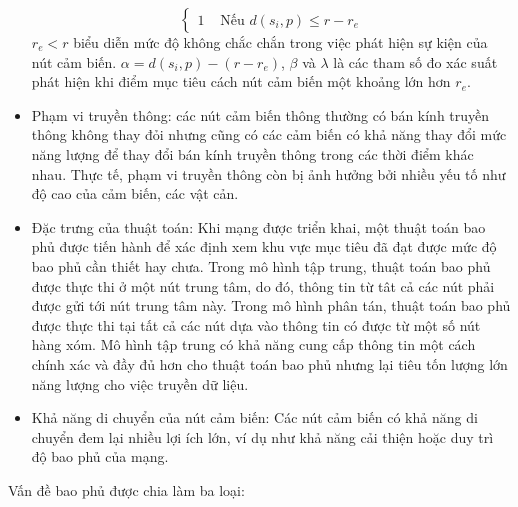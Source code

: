 \documentclass{article}
\begin{document}
\begin{itemize}
\begin{equation}
\begin{cases}
            1 & \text{ Nếu } d(s_i, p) \leq r-r_e
        \end{cases}
    \end{equation}
    $r_e < r$ biểu diễn mức độ không chắc chắn trong việc phát hiện sự kiện của nút cảm biến. $\alpha = d(s_i, p) - (r-r_e)$, $\beta$ và $\lambda$ là các tham số đo xác suất phát hiện khi điểm mục tiêu cách nút cảm biến một khoảng lớn hơn $r_e$.
    \item Phạm vi truyền thông: các nút cảm biến thông thường có bán kính truyền thông không thay đỏi nhưng cũng có các cảm biến có khả năng thay đổi mức năng lượng để thay đổi bán kính truyền thông trong các thời điểm khác nhau. Thực tế, phạm vi truyền thông còn bị ảnh hưởng bởi nhiều yếu tố như độ cao của cảm biến, các vật cản.
    \item Đặc trưng của thuật toán: Khi mạng được triển khai, một thuật toán bao phủ được tiến hành để xác định xem khu vực mục tiêu đã đạt được mức độ bao phủ cần thiết hay chưa. Trong mô hình tập trung, thuật toán bao phủ được thực thi ở một nút trung tâm, do đó, thông tin từ tât cả các nút phải được gửi tới nút trung tâm này. Trong mô hình phân tán, thuật toán bao phủ được thực thi tại tất cả các nút dựa vào thông tin có được từ một số nút hàng xóm. Mô hình tập trung có khả năng cung cấp thông tin một cách chính xác và đầy đủ hơn cho thuật toán bao phủ nhưng lại tiêu tốn lượng lớn năng lượng cho việc truyền dữ liệu.
    \item Khả năng di chuyển của nút cảm biến: Các nút cảm biến có khả năng di chuyển đem lại nhiều lợi ích lớn, ví dụ như khả năng cải thiện hoặc duy trì độ bao phủ của mạng.
\end{itemize}
Vấn đề bao phủ được chia làm ba loại:
\end{document}
